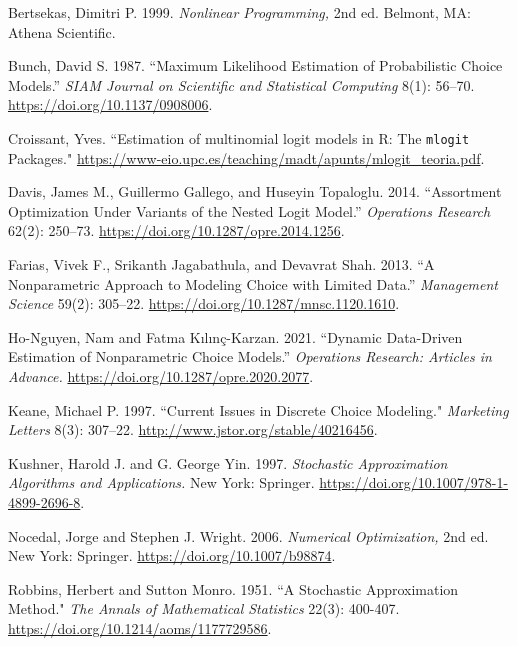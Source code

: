 \documentclass[preprint,12pt,authoryear]{elsarticle}
\begin{document}
\begin{thebibliography}{00}

Bertsekas, Dimitri P. 1999. \emph{Nonlinear Programming,} 2nd ed. Belmont, MA: Athena Scientific. 

Bunch, David S. 1987. ``Maximum Likelihood Estimation of Probabilistic Choice Models.'' \emph{SIAM Journal on Scientific and Statistical Computing} 8(1): 56--70. {\url{https://doi.org/10.1137/0908006}}. 

Croissant, Yves. ``Estimation of multinomial logit models in R: The \texttt{mlogit} Packages." {\url{https://www-eio.upc.es/teaching/madt/apunts/mlogit_teoria.pdf}}. 

Davis, James M.,  Guillermo Gallego, and Huseyin Topaloglu. 2014. ``Assortment Optimization Under Variants of the Nested Logit Model.'' \emph{Operations Research} 62(2): 250--73. {\url{https://doi.org/10.1287/opre.2014.1256}}. 

Farias, Vivek F., Srikanth Jagabathula, and Devavrat Shah. 2013. “A Nonparametric Approach to Modeling Choice with Limited Data.” \emph{Management Science} 59(2): 305--22. {\url{https://doi.org/10.1287/mnsc.1120.1610}}. 

Ho-Nguyen, Nam and Fatma Kılınç-Karzan. 2021. ``Dynamic Data-Driven Estimation of Nonparametric Choice Models.'' \emph{Operations Research: Articles in Advance.} {\url{https://doi.org/10.1287/opre.2020.2077}}.

Keane, Michael P. 1997. ``Current Issues in Discrete Choice Modeling." \emph{Marketing Letters} 8(3): 307--22. {\url{http://www.jstor.org/stable/40216456}}.

Kushner, Harold J. and G. George Yin. 1997. \emph{Stochastic Approximation Algorithms and Applications.} New York: Springer. {\url{https://doi.org/10.1007/978-1-4899-2696-8}}.

Nocedal, Jorge and Stephen J. Wright. 2006. \emph{Numerical Optimization,} 2nd ed. New York: Springer. {\url{https://doi.org/10.1007/b98874}}. 

Robbins, Herbert and Sutton Monro. 1951. ``A Stochastic Approximation Method." \emph{The Annals of Mathematical Statistics} 22(3): 400-407. {\url{https://doi.org/10.1214/aoms/1177729586}}. 


\end{thebibliography}
\end{document}
